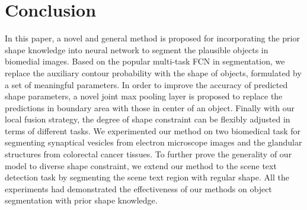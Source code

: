 \documentclass[10pt,twocolumn,letterpaper]{article}
\begin{document}




\section{Conclusion}
In this paper, a novel and general method is proposed for incorporating the prior shape knowledge into neural network to segment the plausible objects in biomedial images.
Based on the popular multi-task FCN in segmentation, we replace the auxiliary contour probability with the shape of objects, formulated by a set of meaningful parameters.
In order to improve the accuracy of predicted shape parameters, a novel joint max pooling layer is proposed to replace the predictions in boundary area with those in center of an object.
Finally with our local fusion strategy, the degree of shape constraint can be flexibly adjusted in terms of different tasks.
We experimented our method on two biomedical task for segmenting synaptical vesicles from electron microscope images and the glandular structures from colorectal cancer tissues.
To further prove the generality of our model to diverse shape constraint, we extend our method to the scene text detection task by segmenting the scene text region with regular shape.
All the experiments had demonstrated the effectiveness of our methods on object segmentation with prior shape knowledge.

{\small


}
\end{document}
